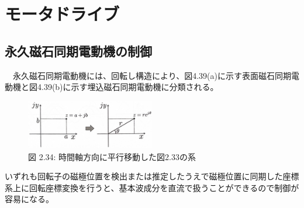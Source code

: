 \documentclass{article}
\begin{document}
\section{モータドライブ}

\setcounter{subsection}{1}
\renewcommand{\thesubsection}{\thesection.\arabic{subsection}}

\subsection{永久磁石同期電動機の制御}
　永久磁石同期電動機には、回転し構造により、図4.39(a)に示す表面磁石同期電動機と図4.39(b)に示す埋込磁石同期電動機に分類される。

\begin{figure}[H]
    \centering
    \includegraphics[width=0.5\textwidth]{images/2_26.jpg}
    \caption{図 2.34: 時間軸方向に平行移動した図2.33の系}
    \label{fig:2.34}
\end{figure}

いずれも回転子の磁極位置を検出または推定したうえで磁極位置に同期した座標系上に回転座標変換を行うと、基本波成分を直流で扱うことができるので制御が容易になる。
　
\end{document}
